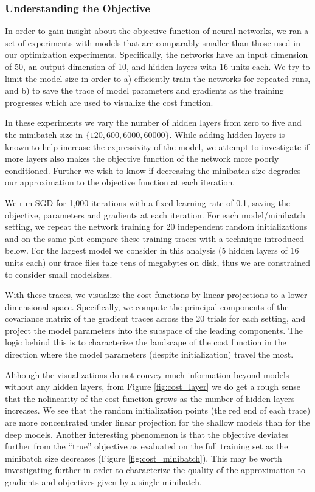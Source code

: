 \subsubsection*{Understanding the Objective}

In order to gain insight about the objective function of neural networks, we
ran a set of experiments with models that are comparably smaller than those
used in our optimization experiments. Specifically, the networks have an input
dimension of 50, an output dimension of 10, and hidden layers with 16 units
each. We try to limit the model size in order to a) efficiently train the
networks for repeated runs, and b) to save the trace of model parameters and
gradients as the training progresses which are used to visualize the cost
function.

In these experiments we vary the number of hidden layers from zero to five and
the minibatch size in $\{120,600,6000,60000\}$.  While adding hidden layers is
known to help increase the expressivity of the model, we attempt to investigate
if more layers also makes the objective function of the network more poorly
conditioned. Further we wish to know if decreasing the minibatch size degrades
our approximation to the objective function at each iteration.

We run SGD for 1,000 iterations with a fixed learning rate of 0.1, saving the
objective, parameters and gradients at each iteration. For each model/minibatch
setting, we repeat the network training for 20 independent random
initializations and on the same plot compare these training traces with a
technique introduced below. For the largest model we consider in this analysis
(5 hidden layers of 16 units each) our trace files take tens of megabytes on
disk, thus we are constrained to consider small modelsizes.

With these traces, we visualize the cost functions by linear projections to a
lower dimensional space. Specifically, we compute the principal components of
the covariance matrix of the gradient traces across the 20 trials for each
setting, and project the model parameters into the subspace of the leading
components. The logic behind this is to characterize the
landscape of the cost function in the direction where the model parameters
(despite initialization) travel the most. 

Although the visualizations do not convey much information beyond models
without any hidden layers, from Figure \ref{fig:cost_layer} we do get a rough
sense that the nolinearity of the cost function grows as the number of hidden
layers increases. We see that the random initialization points (the red end of
each trace) are more concentrated under linear projection for the shallow
models than for the deep models. Another interesting phenomenon is that the
objective deviates further from the ``true'' objective as evaluated on the full
training set as the minibatch size decreases (Figure \ref{fig:cost_minibatch}).
This may be worth investigating further in order to characterize the quality of
the approximation to gradients and objectives given by a single minibatch. 
